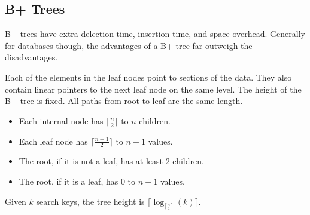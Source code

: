 \documentclass{math}
\begin{document}
\subsection*{B+ Trees}
B+ trees have extra delection time, insertion time, and space overhead.
Generally for databases though, the advantages of a B+ tree far outweigh the
disadvantages.
\begin{center}
  \scalebox{0.8}{
  \begin{forest}
    [Mozart
      [Einstein|Gold
        [Brandt|Cali|Crick]
        [Einstein|ElSaid]
        [Gold|Katz|Kim]
      ]
      [Snu
        [Mozart|Singh]
        [Snu|Wu]
      ]
    ]
  \end{forest}}
\end{center}
Each of the elements in the leaf nodes point to sections of the data. They also
contain linear pointers to the next leaf node on the same level. The height of
the B+ tree is fixed. All paths from root to leaf are the same length.
\begin{itemize}
  \item Each internal node has \( \lceil\frac{n}{2}\rceil \) to \( n \)
    children.
  \item Each leaf node has \( \lceil\frac{n-1}{2}\rceil \) to \( n-1 \) values.
  \item The root, if it is not a leaf, has at least 2 children.
  \item The root, if it is a leaf, has 0 to \( n-1 \) values.
\end{itemize}
Given \( k \) search keys, the tree height is
\( \lceil\log_{\lceil\frac{n}{2}\rceil}(k)\rceil \).
\end{document}
